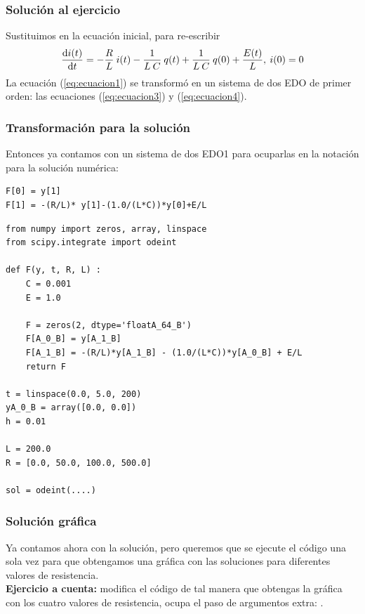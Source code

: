 \begin{frame}
\frametitle{Solución al ejercicio}
Sustituimos en la ecuación inicial, para re-escribir
{\fontsize{12}{12}\selectfont
\begin{align}
\dv{i(t)}{t} = -\dfrac{R}{L} \: i(t) - \dfrac{1}{L \: C} \: q(t) + \dfrac{1}{L \: C} \: q(0) + \dfrac{E(t)}{L}, \: i(0) =  0 
\label{eq:ecuacion4}
\end{align}}
La ecuación (\ref{eq:ecuacion1}) se transformó en un sistema de dos EDO de primer orden: las ecuaciones (\ref{eq:ecuacion3}) y (\ref{eq:ecuacion4}).
\end{frame}
\begin{frame}[fragile]
\frametitle{Transformación para la solución}
Entonces ya contamos con un sistema de dos EDO1 para ocuparlas en la notación para la solución numérica:
\begin{verbatim}
F[0] = y[1]
F[1] = -(R/L)* y[1]-(1.0/(L*C))*y[0]+E/L
\end{verbatim}
\end{frame}
\begin{frame}
\begin{lstlisting}[caption=Código para resolver el circuito RLC, style=codigopython]
from numpy import zeros, array, linspace
from scipy.integrate import odeint

def F(y, t, R, L) : 
    C = 0.001
    E = 1.0
            
    F = zeros(2, dtype='floatA_64_B')
    F[A_0_B] = y[A_1_B]
    F[A_1_B] = -(R/L)*y[A_1_B] - (1.0/(L*C))*y[A_0_B] + E/L
    return F

t = linspace(0.0, 5.0, 200)
yA_0_B = array([0.0, 0.0])
h = 0.01

L = 200.0
R = [0.0, 50.0, 100.0, 500.0]

sol = odeint(....)
\end{lstlisting}
\end{frame}
\begin{frame}
\frametitle{Solución gráfica}
Ya contamos ahora con la solución, pero queremos que se ejecute el código una sola vez para que obtengamos una gráfica con las soluciones para diferentes valores de resistencia.
\\
\bigskip
\textbf{Ejercicio a cuenta:} modifica el código de tal manera que obtengas la gráfica con los cuatro valores de resistencia, ocupa el paso de argumentos extra: .
\end{frame}
